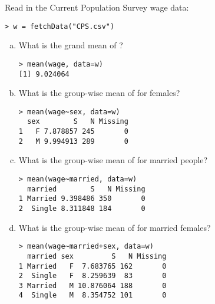 
Read in the Current Population Survey wage data:
\begin{verbatim}
> w = fetchData("CPS.csv")
\end{verbatim}

\begin{enumerate}[(a)]
\item What is the grand mean of ?\\
\begin{AnswerText}
\begin{verbatim}
> mean(wage, data=w)
[1] 9.024064
\end{verbatim}
\end{AnswerText}
\item What is the group-wise mean of  for females? 
\begin{AnswerText}
\begin{verbatim}
> mean(wage~sex, data=w)
  sex        S   N Missing
1   F 7.878857 245       0
2   M 9.994913 289       0
\end{verbatim}
\end{AnswerText}
\item What is the group-wise mean of  for married people? 
\begin{AnswerText}
\begin{verbatim}
> mean(wage~married, data=w)
  married        S   N Missing
1 Married 9.398486 350       0
2  Single 8.311848 184       0
\end{verbatim}
\end{AnswerText}
\item What is the group-wise mean of  for married females? 
\begin{AnswerText}
\begin{verbatim}
> mean(wage~married+sex, data=w)
  married sex         S   N Missing
1 Married   F  7.683765 162       0
2  Single   F  8.259639  83       0
3 Married   M 10.876064 188       0
4  Single   M  8.354752 101       0
\end{verbatim}
\end{AnswerText}

\end{enumerate}